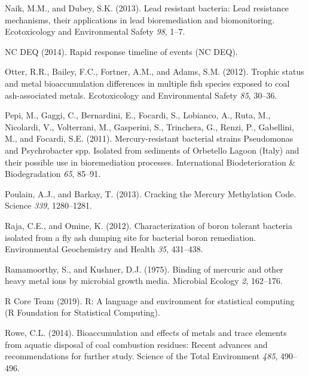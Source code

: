 \documentclass[ms, hidelinks]{uncgdissertationexp}
\theoremstyle{plain}
\theoremstyle{definition}
\theoremstyle{remark}
\begin{document}
\leavevmode\hypertarget{ref-naikLeadResistantBacteria2013}{}%
Naik, M.M., and Dubey, S.K. (2013). Lead resistant bacteria: Lead resistance mechanisms, their applications in lead bioremediation and biomonitoring. Ecotoxicology and Environmental Safety \emph{98}, 1--7.

\leavevmode\hypertarget{ref-ncdeqRapidResponseTimeline2014}{}%
NC DEQ (2014). Rapid response timeline of events (NC DEQ).

\leavevmode\hypertarget{ref-otterTrophicStatusMetal2012}{}%
Otter, R.R., Bailey, F.C., Fortner, A.M., and Adams, S.M. (2012). Trophic status and metal bioaccumulation differences in multiple fish species exposed to coal ash-associated metals. Ecotoxicology and Environmental Safety \emph{85}, 30--36.

\leavevmode\hypertarget{ref-pepiMercuryresistantBacterialStrains2011}{}%
Pepi, M., Gaggi, C., Bernardini, E., Focardi, S., Lobianco, A., Ruta, M., Nicolardi, V., Volterrani, M., Gasperini, S., Trinchera, G., Renzi, P., Gabellini, M., and Focardi, S.E. (2011). Mercury-resistant bacterial strains Pseudomonas and Psychrobacter spp. Isolated from sediments of Orbetello Lagoon (Italy) and their possible use in bioremediation processes. International Biodeterioration \& Biodegradation \emph{65}, 85--91.

\leavevmode\hypertarget{ref-poulainCrackingMercuryMethylation2013}{}%
Poulain, A.J., and Barkay, T. (2013). Cracking the Mercury Methylation Code. Science \emph{339}, 1280--1281.

\leavevmode\hypertarget{ref-rajaCharacterizationBoronTolerant2012}{}%
Raja, C.E., and Omine, K. (2012). Characterization of boron tolerant bacteria isolated from a fly ash dumping site for bacterial boron remediation. Environmental Geochemistry and Health \emph{35}, 431--438.

\leavevmode\hypertarget{ref-ramamoorthyBindingMercuricOther1975}{}%
Ramamoorthy, S., and Kushner, D.J. (1975). Binding of mercuric and other heavy metal ions by microbial growth media. Microbial Ecology \emph{2}, 162--176.

\leavevmode\hypertarget{ref-rcoreteamLanguageEnvironmentStatistical2019}{}%
R Core Team (2019). R: A language and environment for statistical computing (R Foundation for Statistical Computing).

\leavevmode\hypertarget{ref-roweBioaccumulationEffectsMetals2014}{}%
Rowe, C.L. (2014). Bioaccumulation and effects of metals and trace elements from aquatic disposal of coal combustion residues: Recent advances and recommendations for further study. Science of the Total Environment \emph{485}, 490--496.
\end{document}
